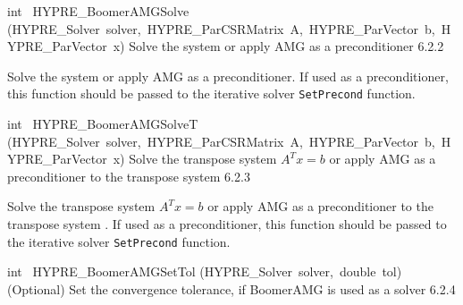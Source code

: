 \documentclass{article}
\begin{document}
\begin{cxxentry}
\begin{cxxentry}
\begin{cxxfunction}
\begin{cxxdoc}
\end{cxxdoc}
\end{cxxfunction}
\begin{cxxfunction}
{int\ }
        {HYPRE\_BoomerAMGSolve}
        {(HYPRE\_Solver\ solver,\ HYPRE\_ParCSRMatrix\ A,\ HYPRE\_ParVector\ b,\ HYPRE\_ParVector\ x)}
        {
Solve the system or apply AMG as a preconditioner}
        {6.2.2}
\begin{cxxdoc}

Solve the system or apply AMG as a preconditioner.
If used as a preconditioner, this function should be passed
to the iterative solver {\tt SetPrecond} function.


\end{cxxdoc}
\end{cxxfunction}
\begin{cxxfunction}
{int\ }
        {HYPRE\_BoomerAMGSolveT}
        {(HYPRE\_Solver\ solver,\ HYPRE\_ParCSRMatrix\ A,\ HYPRE\_ParVector\ b,\ HYPRE\_ParVector\ x)}
        {
Solve the transpose system $A^T x = b$ or apply AMG as a preconditioner
to the transpose system }
        {6.2.3}
\begin{cxxdoc}

Solve the transpose system $A^T x = b$ or apply AMG as a preconditioner
to the transpose system .
If used as a preconditioner, this function should be passed
to the iterative solver {\tt SetPrecond} function.


\end{cxxdoc}
\end{cxxfunction}
\begin{cxxfunction}
{int\ }
        {HYPRE\_BoomerAMGSetTol}
        {(HYPRE\_Solver\ solver,\ double\ tol)}
        {
(Optional) Set the convergence tolerance, if BoomerAMG is used
as a solver}
        {6.2.4}
\begin{cxxdoc}


\end{cxxdoc}
\end{cxxfunction}
\end{cxxentry}
\end{cxxentry}
\end{document}
